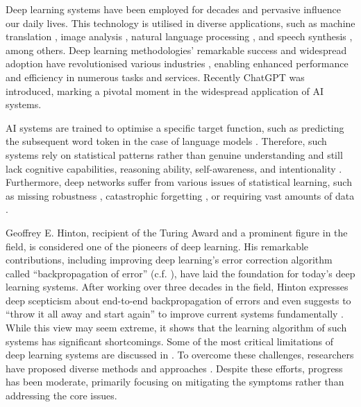 Deep learning systems have been employed for decades \cite{ivakhnenko_cybernetic_1965} and pervasive influence our daily lives. This technology is utilised in diverse applications, such as machine translation \cite{dabre_survey_2021}, image analysis \cite{bhatt_cnn_2021}, natural language processing \cite{otter_survey_2021}, and speech synthesis \cite{ning_review_2019}, among others. Deep learning methodologies' remarkable success and widespread adoption have revolutionised various industries , enabling enhanced performance and efficiency in numerous tasks and services.
Recently ChatGPT  was introduced, marking a pivotal moment in the widespread application of AI systems.

AI systems are trained to optimise a specific target function, such as predicting the subsequent word token in the case of language models .
Therefore, such systems rely on statistical patterns rather than genuine understanding and still lack cognitive capabilities, reasoning ability, self-awareness, and intentionality .
Furthermore, deep networks suffer from various issues of statistical learning, such as missing robustness , catastrophic forgetting , or requiring vast amounts of data .

Geoffrey E. Hinton, recipient of the Turing Award and a prominent figure in the field, is considered one of the pioneers of deep learning.
His remarkable contributions, including improving deep learning's error correction algorithm called ``backpropagation of error''   (c.f. ), have laid the foundation for today's deep learning systems.
After working over three decades in the field, Hinton expresses deep scepticism about end-to-end backpropagation of errors and even suggests to ``throw it all away and start again'' to improve current systems fundamentally .
While this view may seem extreme, it shows that the learning algorithm of such systems has significant shortcomings.
Some of the most critical limitations of deep learning systems are discussed in .
To overcome these challenges, researchers have proposed diverse methods and approaches \cite{long_survey_2022, sager_unsupervised_2022, yarats_improving_2021}. Despite these efforts, progress has been moderate, primarily focusing on mitigating the symptoms rather than addressing the core issues.

